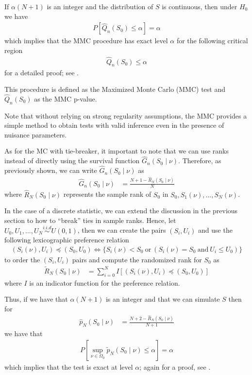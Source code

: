 \documentclass[11pt]{article}\usepackage[]{graphicx}\usepackage[]{color}
\begin{document}
If $\alpha(N+1)$ is an integer and the distribution of $S$ is continuous, then under $H_0$ we have
\begin{align}
P [\hat{Q}_n(S_0) \leq \alpha] = \alpha
\end{align}
which implies that the MMC procedure has exact level $\alpha$ for the following critical region
\begin{align}
	\hat{Q}_n(S_0) \leq \alpha
\end{align}
for a detailed proof; see \cite{dufour_monte_2006}.

This procedure is defined as the Maximized Monte Carlo (MMC) test and $\hat{Q}_n(S_0)$ as the MMC p-value.

Note that without relying on strong regularity assumptions, the MMC provides a simple method to obtain tests with valid inference even in the presence of nuisance parameters.

As for the MC with tie-breaker, it important to note that we can use ranks instead of directly using the survival function $\hat{G}_{n}(S_{0} \mid \nu)$. Therefore, as previously shown, we can write $\hat{G}_{n}(S_{0} \mid \nu)$ as
\begin{align}
\hat{G}_{n}(S_{0} \mid \nu) &= \frac{N+1-\hat{R}_N(S_0 \mid \nu)}{N}
\end{align}
where $\hat{R}_N(S_0 \mid \nu)$ represents the sample rank of $S_0$ in $S_0, S_1(\nu),...,S_N(\nu)$.

In the case of a discrete statistic, we can extend the discussion in the previous section to how to ``break'' ties in sample ranks. Hence, let $U_0, U_1,...,U_N \overset{i.i.d}{\sim} U(0,1)$, then we can create the pairs $(S_i,U_i)$ and use the following lexicographic preference relation
\begin{align}
 	(S_i(\nu),U_i) \preccurlyeq (S_0,U_0) \Longleftrightarrow \{ S_i(\nu)<S_0 \ \mathrm{or} \ ( S_i(\nu) = S_0 \ \mathrm{and} \ U_i \leq U_0 ) \}
\end{align}
 to order the $(S_i,U_i)$ pairs and compute the randomized rank for $S_0$ as
 \begin{align}
 	\tilde{R}_{N}(S_0\mid \nu) & = \sum_{i=0}^{N}I[(S_i(\nu),U_i) \preccurlyeq (S_0,U_0)]
 \end{align}
 where $I$ is an indicator function for the preference relation.

Thus, if we have that $\alpha(N+1)$ is an integer and that we can simulate $S$ then for
\begin{align}
\hat{p}_{N}(S_{0} \mid \nu) & = \frac{N + 2 -\hat{R}_N(S_0 \mid \nu)}{N+1}
\end{align}
we have that
\begin{align}
P [\sup_{\nu \in \Omega_0} \tilde{p}_{N}(S_{0} \mid \nu) \leq \alpha] = \alpha
\end{align}
which implies that the test is exact at level $\alpha$; again for a proof, see \cite{dufour_monte_2006}.
\end{document}
